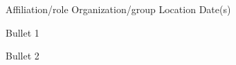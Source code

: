 

\begin{cventries}

  \cventry
    {Affiliation/role} %
    {Organization/group} %
    {Location} %
    {Date(s)} %
    {
      \begin{cvitems} %
        \item {Bullet 1}
        \item {Bullet 2}
      \end{cvitems}
    }

\end{cventries}
